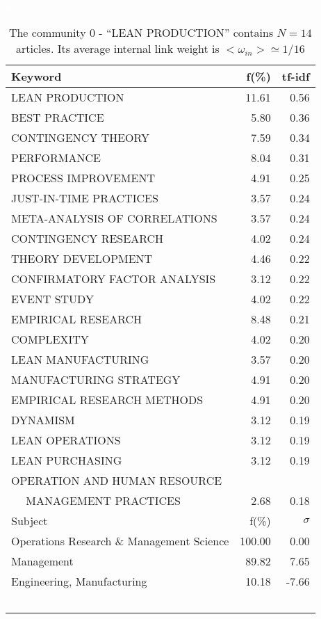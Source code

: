 \documentclass[a4paper,11pt]{report}
\begin{document}
\begin{landscape}
\clearpage

\begin{table}[!ht]
\caption{The community 0 - ``LEAN PRODUCTION'' contains $N = 14$ articles. Its average internal link weight is $<\omega_{in}> \simeq 1/16$ }
\textcolor{white}{aa}\\
{\scriptsize\begin{tabular}{|l r  r|}
\hline
Keyword & f(\%) & tf-idf \\
\hline
LEAN PRODUCTION & 11.61 & 0.56\\
BEST PRACTICE & 5.80 & 0.36\\
CONTINGENCY THEORY & 7.59 & 0.34\\
PERFORMANCE & 8.04 & 0.31\\
PROCESS IMPROVEMENT & 4.91 & 0.25\\
JUST-IN-TIME PRACTICES & 3.57 & 0.24\\
META-ANALYSIS OF CORRELATIONS & 3.57 & 0.24\\
CONTINGENCY RESEARCH & 4.02 & 0.24\\
THEORY DEVELOPMENT & 4.46 & 0.22\\
CONFIRMATORY FACTOR ANALYSIS & 3.12 & 0.22\\
EVENT STUDY & 4.02 & 0.22\\
EMPIRICAL RESEARCH & 8.48 & 0.21\\
COMPLEXITY & 4.02 & 0.20\\
LEAN MANUFACTURING & 3.57 & 0.20\\
MANUFACTURING STRATEGY & 4.91 & 0.20\\
EMPIRICAL RESEARCH METHODS & 4.91 & 0.20\\
DYNAMISM & 3.12 & 0.19\\
LEAN OPERATIONS & 3.12 & 0.19\\
LEAN PURCHASING & 3.12 & 0.19\\
OPERATION AND HUMAN RESOURCE &  &\\
$\quad$ MANAGEMENT PRACTICES & 2.68 & 0.18\\
\hline
\hline
Subject & f(\%) & $\sigma$\\
\hline
Operations Research \& Management Science & 100.00 & 0.00\\
Management & 89.82 & 7.65\\
Engineering, Manufacturing & 10.18 & -7.66\\
 &  & \\
 &  & \\
 &  & \\
 &  & \\
 &  & \\

\end{tabular}}
\end{table}
\end{landscape}
\end{document}
